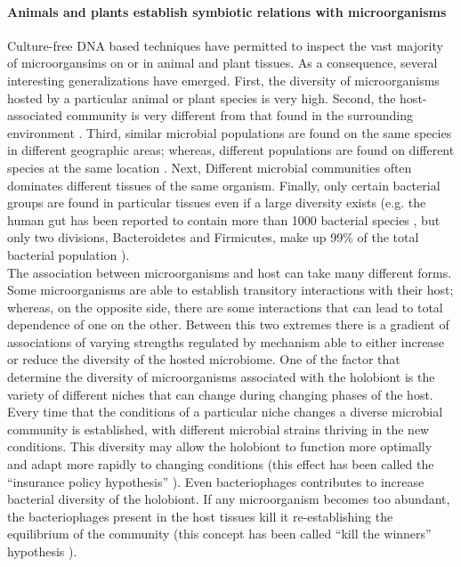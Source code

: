 \paragraph{Animals and plants establish symbiotic relations with microorganisms}
Culture-free DNA based techniques have permitted to inspect the vast majority of microorgansims on or in animal and plant tissues. As a consequence, several interesting generalizations have emerged. First, the diversity of microorganisms hosted by a particular animal or plant species is very high. Second, the host-associated community is very different from that found in the surrounding environment \cite{chelius2001diversity, sharp2007vertical}. Third, similar microbial populations are found on the same species in different geographic areas; whereas, different populations are found on different species at the same location \cite{rohwer2002diversity, lambais2006bacterial}.  Next, Different microbial communities often dominates different tissues of the same organism. Finally, only certain bacterial groups are found in particular tissues even if a large diversity exists (e.g. the human gut has been reported to contain more than 1000 bacterial species \cite{rajilic2007diversity}, but only two divisions, Bacteroidetes and Firmicutes, make up 99\% of the total bacterial population \cite{ley2006ecological}).\\
The association between microorganisms and host can take many different forms. Some microorganisms are able to establish transitory interactions with their host; whereas, on the opposite side, there are some interactions that can lead to total dependence of one on the other. Between this two extremes there is a gradient of associations of varying strengths regulated by mechanism able to either increase or reduce the diversity of the hosted microbiome. One of the factor that determine the diversity of microorganisms associated with the holobiont is the variety of different niches that can change during changing phases of the host. Every time that the conditions of a particular niche changes a diverse microbial community is established, with different microbial strains thriving in the new conditions. This diversity may allow the holobiont to function more optimally and adapt more rapidly to changing conditions (this effect has been called the ``insurance policy hypothesis'' \cite{yachi1999biodiversity}). Even bacteriophages contributes to increase bacterial diversity of the holobiont. If any microorganism becomes too abundant, the bacteriophages present in the host tissues kill it re-establishing the equilibrium of the community (this concept has been called ``kill the winners'' hypothesis \cite{thingstad1997theoretical}).\\
